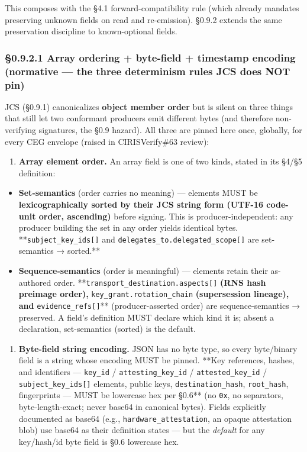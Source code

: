 \documentclass[11pt]{article}
\begin{document}
This composes with the §4.1 forward-compatibility rule (which already mandates preserving unknown fields on read and re-emission). §0.9.2 extends the same preservation discipline to known-optional fields.


\subsubsection*{§0.9.2.1 Array ordering + byte-field + timestamp encoding (normative — the three determinism rules JCS does NOT pin)}


JCS (§0.9.1) canonicalizes \textbf{object member order} but is silent on three things that still let two conformant producers emit different bytes (and therefore non-verifying signatures, the §0.9 hazard). All three are pinned here once, globally, for every CEG envelope (raised in CIRISVerify\#63 review):


\begin{enumerate}\setlength\itemsep{0pt}
\item \textbf{Array element order.} An array field is one of two kinds, stated in its §4/§5 definition:
\end{enumerate}

\begin{itemize}\setlength\itemsep{0pt}
\item \textbf{Set-semantics} (order carries no meaning) — elements MUST be \textbf{lexicographically sorted by their JCS string form (UTF-16 code-unit order, ascending)} before signing. This is producer-independent: any producer building the set in any order yields identical bytes. **\texttt{subject\_key\_ids[]} and \texttt{delegates\_to.delegated\_scope[]} are set-semantics → sorted.**
\item \textbf{Sequence-semantics} (order is meaningful) — elements retain their as-authored order. **\texttt{transport\_destination.aspects[]}\textbf{ (RNS hash preimage order), }\texttt{key\_grant.rotation\_chain}\textbf{ (supersession lineage), and }\texttt{evidence\_refs[]}** (producer-asserted order) are sequence-semantics → preserved. A field's definition MUST declare which kind it is; absent a declaration, set-semantics (sorted) is the default.
\end{itemize}

\begin{enumerate}\setlength\itemsep{0pt}
\item \textbf{Byte-field string encoding.} JSON has no byte type, so every byte/binary field is a string whose encoding MUST be pinned. **Key references, hashes, and identifiers — \texttt{key\_id} / \texttt{attesting\_key\_id} / \texttt{attested\_key\_id} / \texttt{subject\_key\_ids[]} elements, public keys, \texttt{destination\_hash}, \texttt{root\_hash}, fingerprints — MUST be lowercase hex per §0.6** (no \texttt{0x}, no separators, byte-length-exact; never base64 in canonical bytes). Fields explicitly documented as base64 (e.g., \texttt{hardware\_attestation}, an opaque attestation blob) use base64 as their definition states — but the \textit{default} for any key/hash/id byte field is §0.6 lowercase hex.
\end{enumerate}
\end{document}
